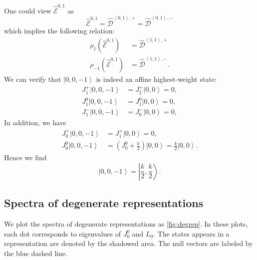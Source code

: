 \documentclass[10pt,a4paper]{article}
\numberwithin{equation}{section}
\newcommand{\ket}[1]{\left| #1 \right\rangle}
\newcommand{\vev}[1]{\left\langle #1 \right\rangle}
\begin{document}
One could view $\hat{\mathcal{E}}^{0,1}$ as
\begin{equation}
    \hat{\mathcal{E}}^{0,1} = \hat{\mathcal{D}}^{\vev{0,1},+} = \hat{\mathcal{D}}^{\vev{0,1},-}
\end{equation}
which implies the following relation: 
\begin{equation}
    \begin{aligned}
        \rho_{1} \left(\hat{\mathcal{E}}^{0,1}\right) &= \hat{\mathcal{D}}^{\vev{1,1},+}\\
        \rho_{-1} \left(\hat{\mathcal{E}}^{0,1}\right) &= \hat{\mathcal{D}}^{\vev{1,1},-}.
    \end{aligned}
\end{equation}
We can verify that $\ket{0,0,-1}$ is indeed an affine highest-weight state:
\begin{equation}
    \begin{aligned}
        J^{+}_{1} \ket{0,0,-1} &= J^{+}_{2} \ket{0,0} = 0, \\
        J^{0}_{1} \ket{0,0,-1} &= J^{0}_{1} \ket{0,0} = 0, \\
        J^{-}_{1} \ket{0,0,-1} &= J^{-}_{0} \ket{0,0} = 0, 
    \end{aligned}
\end{equation}
In addition, we have 
\begin{equation}
    \begin{aligned}
        J^{+}_{0} \ket{0,0,-1} &= J^{+}_{1} \ket{0,0} = 0,\\
        J^{0}_{0} \ket{0,0,-1} &= \left(J^{0}_{0} + \frac{k}{2} \right) \ket{0,0} = \frac{k}{2} \ket{0,0}.
    \end{aligned}
\end{equation}
Hence we find 
\begin{equation}
    \ket{0,0,-1} = \ket{\frac{k}{2}, \frac{k}{2}}.
\end{equation}

\subsection{Spectra of degenerate representations}
We plot the spectra of degenerate representations as \ref{fig:degrep}. In these plots, each dot corresponds to eigenvalues of $J^{0}_{0}$ and 
$L_{0}$. The states appears in a representation are denoted by the shadowed area. The null vectors are labeled by the blue dashed line. 
\end{document}
